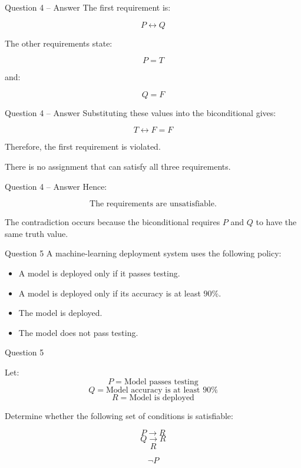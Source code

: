 \begin{frame}{Question 4 -- Answer}
The first requirement is:

$$
P\leftrightarrow Q
$$

The other requirements state:

$$
P=T
$$

and:

$$
Q=F
$$

\end{frame}

\begin{frame}{Question 4 -- Answer}
Substituting these values into the biconditional gives:

$$
T\leftrightarrow F=F
$$

Therefore, the first requirement is violated.

There is no assignment that can satisfy all three requirements.
\end{frame}

\begin{frame}{Question 4 -- Answer}
Hence:

$$
\boxed{\text{The requirements are unsatisfiable.}}
$$

The contradiction occurs because the biconditional requires $P$ and $Q$
to have the same truth value.
\end{frame}


\begin{frame}{Question 5}
A machine-learning deployment system uses the following policy:

\begin{itemize}
\item A model is deployed only if it passes testing.
\item A model is deployed only if its accuracy is at least $90\%$.
\item The model is deployed.
\item The model does not pass testing.
\end{itemize}

\end{frame}

\begin{frame}{Question 5}

Let:
$$
P = \text{Model passes testing}
$$
$$
Q = \text{Model accuracy is at least }90\%
$$
$$
R = \text{Model is deployed}
$$

Determine whether the following set of conditions is satisfiable:

$$
P\rightarrow R
$$
$$
Q\rightarrow R
$$
$$
R
$$

$$
\neg P
$$

\end{frame}

